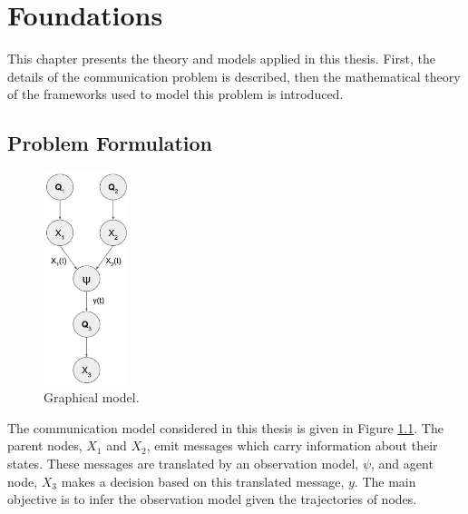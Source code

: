 \DeclareRobustCommand{\rchi}{{\mathpalette\irchi\relax}}
\newcommand{\irchi}[2]{\raisebox{\depth}{$#1\chi$}}

\chapter{Foundations}

This chapter presents the theory and models applied in this thesis. First, the details of the communication problem is described, then the mathematical theory of the frameworks used to model this problem is introduced.

\section{Problem Formulation}
\begin{figure}
	\begin{center}
		\includegraphics[width=2.5cm]{figures/h_model}
		\caption{Graphical model.}
	\end{center}
	\label{wrap-fig:1}
\end{figure} 
The communication model considered in this thesis is given in Figure \ref{wrap-fig:1}. The parent nodes, $X_{1}$ and $ X_{2}$, emit messages which carry information about their states. These messages are translated by an observation model, $\psi$, and agent node, $ X_{3} $ makes a decision based on this translated message, $ y $. The main objective is to infer the observation model given the trajectories of nodes.

